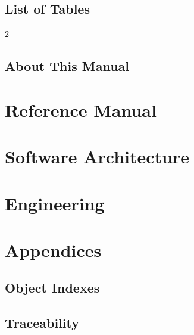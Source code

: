 \documentclass[10pt,a4paper,oneside]{report}
\begin{document}
\chapter*{List of Tables}
\begin{multicols}{2}\small
\makeatletter{}\makeatother
\end{multicols}

\chapter*{About This Manual}


\part{Reference Manual}


\part{Software Architecture}


\part{Engineering}


\appendix
\part{Appendices}

\chapter{Object Indexes}
\label{app:indexes}


\chapter{Traceability}
\label{app:traceability}





\cleardoublepage
{}
\printindex
\end{document}
